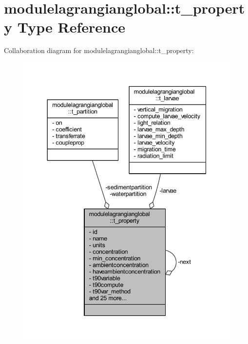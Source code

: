 \hypertarget{structmodulelagrangianglobal_1_1t__property}{}\section{modulelagrangianglobal\+:\+:t\+\_\+property Type Reference}
\label{structmodulelagrangianglobal_1_1t__property}


Collaboration diagram for modulelagrangianglobal\+:\+:t\+\_\+property\+:\nopagebreak
\begin{figure}[H]
\begin{center}
\leavevmode
\includegraphics[width=344pt]{structmodulelagrangianglobal_1_1t__property__coll__graph}
\end{center}
\end{figure}
